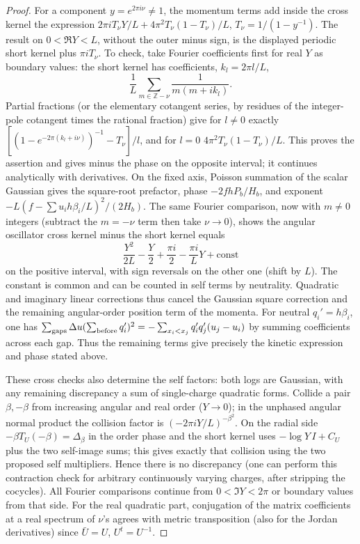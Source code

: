 \begin{proof}
For a component \(y=e^{2\pi i\nu}\ne1\), the momentum terms add inside the cross kernel the expression \(2\pi i T_\nu Y/L+4\pi^2 T_\nu(1-T_\nu)/L\), \(T_\nu=1/(1-y^{-1})\). The result on \(0<\Re Y<L\), without the outer minus sign, is the displayed periodic short kernel plus \(\pi i T_\nu\). To check, take Fourier coefficients first for real \(Y\) as boundary values: the short kernel has coefficients, \(k_l=2\pi l/L\),
\[
 \frac1L\sum_{m\in\mathbb Z-\nu}\frac1{m(m+i k_l)}.
\]
Partial fractions (or the elementary cotangent series, by residues of the integer-pole cotangent times the rational fraction) give for \(l\ne0\) exactly \([(1-e^{-2\pi(k_l+i\nu)})^{-1}-T_\nu]/l\), and for \(l=0\) \(4\pi^2 T_\nu(1-T_\nu)/L\). This proves the assertion and gives minus the phase on the opposite interval; it continues analytically with derivatives. On the fixed axis, Poisson summation of the scalar Gaussian gives the square-root prefactor, phase \(-2 f hP_b/H_b\), and exponent \(-L(f-\sum u_i h\beta_i/L)^2/(2H_b)\). The same Fourier comparison, now with \(m\ne0\) integers (subtract the \(m=-\nu\) term then take \(\nu\to0\)), shows the angular oscillator cross kernel minus the short kernel equals
\[
 \frac{Y^2}{2L}-\frac Y2+\frac{\pi i}2-\frac{\pi i}{L}Y+\mathrm{const}
\]
on the positive interval, with sign reversals on the other one (shift by \(L\)). The constant is common and can be counted in self terms by neutrality. Quadratic and imaginary linear corrections thus cancel the Gaussian square correction and the remaining angular-order position term of the momenta. For neutral \(q_i'=h\beta_i\), one has \(\sum_{\rm gaps}\Delta u(\sum_{\rm before}q_i')^2=-\sum_{x_i<x_j}q_i'q_j'(u_j-u_i)\) by summing coefficients across each gap. Thus the remaining terms give precisely the kinetic expression and phase stated above.

These cross checks also determine the self factors: both logs are Gaussian, with any remaining discrepancy a sum of single-charge quadratic forms. Collide a pair \(\beta,-\beta\) from increasing angular and real order (\(Y\to0\)); in the unphased angular normal product the collision factor is \((-2\pi iY/L)^{-\beta^2}\). On the radial side \(-\beta T_U(-\beta)=\Delta_\beta\) in the order phase and the short kernel uses \(-\log Y\,I+C_U\) plus the two self-image sums; this gives exactly that collision using the two proposed self multipliers. Hence there is no discrepancy (one can perform this contraction check for arbitrary continuously varying charges, after stripping the cocycles). All Fourier comparisons continue from \(0<\Im Y<2\pi\) or boundary values from that side. For the real quadratic part, conjugation of the matrix coefficients at a real spectrum of \(\nu\)'s agrees with metric transposition (also for the Jordan derivatives) since \(\bar U=U\), \(U^t=U^{-1}\).

\end{proof}

